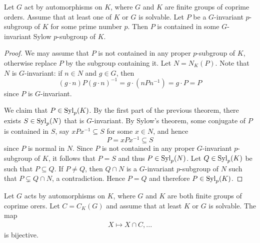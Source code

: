 \begin{corollary}
	Let $G$ act by automorphisms on $K$, where $G$ and $K$ are finite groups of coprime orders. Assume that 
	at least one of $K$ or $G$ is solvable. Let $P$ be a $G$-invariant $p$-subgroup 
	of $K$ for some prime number $p$. Then $P$ is contained in some $G$-invariant Sylow $p$-subgroup of $K$.  
\end{corollary}

\begin{proof}
	We may assume that $P$ is not contained in any proper $p$-subgroup of $K$, otherwise replace $P$ by the subgroup
	containing it. Let $N=N_K(P)$. Note that $N$ is $G$-invariant: if $n\in N$ and $g\in G$, then
	\[
	(g\cdot n)P(g\cdot n)^{-1}=g\cdot (nPn^{-1})=g\cdot P=P
	\]	
	since $P$ is $G$-invariant. 
	
	We claim that $P\in\mathrm{Syl}_p(K)$. By the first part of the previous theorem, there exists 
	$S\in\mathrm{Syl}_p(N)$ that is $G$-invariant. By Sylow's theorem, 
	some conjugate of $P$ is contained in $S$, say $xPx^{-1}\subseteq S$ for some $x\in N$, and hence
	\[
	P=xPx^{-1}\subseteq S
	\]
	since $P$ is normal in $N$. Since $P$ is not contained in any proper $G$-invariant 
	$p$-subgroup of $K$, it follows that $P=S$ 
	and thus $P\in\mathrm{Syl}_p(N)$.   
	Let $Q\in\mathrm{Syl}_p(K)$ be such that $P\subseteq Q$. If $P\ne Q$, then  
	$Q\cap N$ is a $G$-invariant $p$-subgroup of $N$ such that $P\subsetneq Q\cap N$, a contradiction. 
	Hence $P=Q$ and therefore
	$P\in\mathrm{Syl}_p(K)$.
\end{proof}

\begin{theorem}
Let $G$ acts by automorphisms on $K$, where $G$ and 
$K$ are both finite groups of coprime orers. Let $C=C_K(G)$ and assume that at least $K$ or $G$ is solvable. 
The map
\begin{align*}
X\mapsto X\cap C,
...
\end{align*}
is bijective.
\end{theorem}

%


